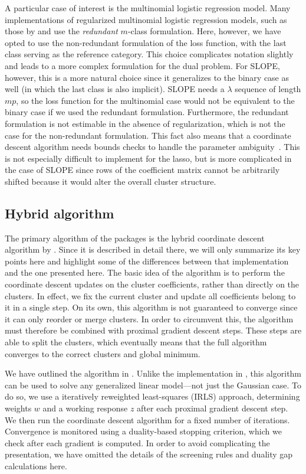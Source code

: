 \documentclass[article]{jss}
\let\Cref\crtCref
\begin{document}
A particular case of interest is the multinomial logistic regression model.
Many implementations of regularized multinomial logistic regression models, such
as those by \citet{friedman2010} and \citet{fercoq2015} use the \emph{redundant}
\(m\)-class formulation. Here, however, we have opted to use the non-redundant
formulation of the loss function, with the last class serving as the reference
category. This choice complicates notation slightly and leads to a more
complex formulation for the dual problem. For SLOPE, however, this is a
more natural choice since it generalizes to the binary case as well (in which
the last class is also implicit). SLOPE needs a \(\lambda\) sequence of length
\(mp\), so the loss function for the multinomial case would not be equivalent
to the binary case if we used the redundant formulation. Furthermore, the
redundant formulation is not estimable in the absence of regularization, which
is not the case for the non-redundant formulation. This fact also means that a
coordinate descent algorithm needs bounds checks to handle the parameter
ambiguity~\citep{friedman2010}. This is not especially difficult to implement
for the lasso, but is more complicated in the case of SLOPE since rows of the
coefficient matrix cannot be arbitrarily shifted because it would alter the
overall cluster structure.

\subsection{Hybrid algorithm}

The primary algorithm of the  packages is the hybrid coordinate
descent algorithm by \citet{larsson2023}. Since it is described in detail
there, we will only summarize its key points here and highlight
some of the differences between that implementation and the one presented here.
The basic idea of the algorithm is to perform the coordinate descent updates on
the cluster coefficients, rather than directly on the clusters. In effect, we fix the
current cluster and update all coefficients belong to it in a single step.
On its own, this algorithm is not guaranteed to converge since it can only
reorder or merge clusters. In order to circumvent this, the algorithm must
therefore be combined with proximal gradient descent steps. These steps
are able to split the clusters, which eventually means that the full
algorithm converges to the correct clusters and global minimum.

We have outlined the algorithm in \Cref{alg:hybrid}. Unlike the implementation
in \citet{larsson2023}, this algorithm can be used to solve
any generalized linear model---not just the Gaussian case. To do so,
we use a iteratively reweighted least-squares (IRLS) approach, determining
weights \(w\) and a working response \(z\) after each proximal gradient descent step.
We then run the coordinate descent algorithm for a fixed number of iterations.
Convergence is monitored using a duality-based stopping criterion, which
we check after each gradient is computed. In order to avoid complicating
the presentation, we have omitted the details of the screening rules and duality
gap calculations here.
\end{document}
